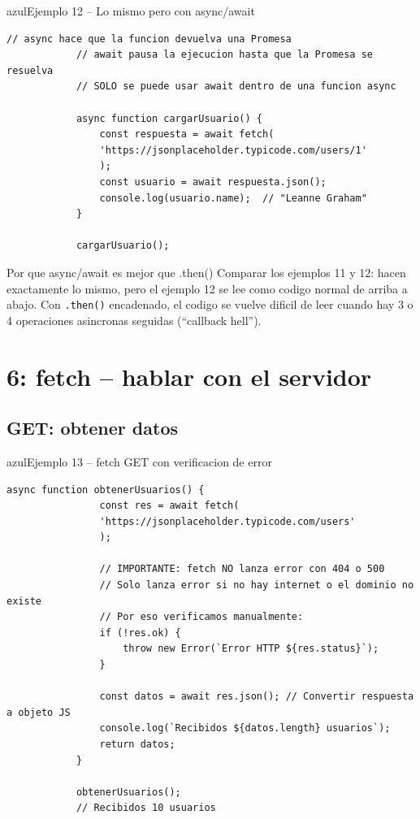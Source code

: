\documentclass[11pt,a4paper]{article}
\begin{document}
	\begin{cajacodigo}{azul}{Ejemplo 12 -- Lo mismo pero con async/await}
		\begin{lstlisting}[style=codejs]
			// async hace que la funcion devuelva una Promesa
			// await pausa la ejecucion hasta que la Promesa se resuelva
			// SOLO se puede usar await dentro de una funcion async
			
			async function cargarUsuario() {
				const respuesta = await fetch(
				'https://jsonplaceholder.typicode.com/users/1'
				);
				const usuario = await respuesta.json();
				console.log(usuario.name);  // "Leanne Graham"
			}
			
			cargarUsuario();
		\end{lstlisting}
	\end{cajacodigo}
	
	\begin{cajaconcepto}{Por que async/await es mejor que .then()}
		Comparar los ejemplos 11 y 12: hacen exactamente lo mismo, pero el ejemplo 12 se lee como codigo normal de arriba a abajo. Con \texttt{.then()} encadenado, el codigo se vuelve dificil de leer cuando hay 3 o 4 operaciones asincronas seguidas (``callback hell'').
	\end{cajaconcepto}
	
	\section{6: fetch -- hablar con el servidor}
	
	\subsection{GET: obtener datos}
	
	\begin{cajacodigo}{azul}{Ejemplo 13 -- fetch GET con verificacion de error}
		\begin{lstlisting}[style=codejs]
			async function obtenerUsuarios() {
				const res = await fetch(
				'https://jsonplaceholder.typicode.com/users'
				);
				
				// IMPORTANTE: fetch NO lanza error con 404 o 500
				// Solo lanza error si no hay internet o el dominio no existe
				// Por eso verificamos manualmente:
				if (!res.ok) {
					throw new Error(`Error HTTP ${res.status}`);
				}
				
				const datos = await res.json(); // Convertir respuesta a objeto JS
				console.log(`Recibidos ${datos.length} usuarios`);
				return datos;
			}
			
			obtenerUsuarios();
			// Recibidos 10 usuarios
		\end{lstlisting}
	\end{cajacodigo}
	
\end{document}
